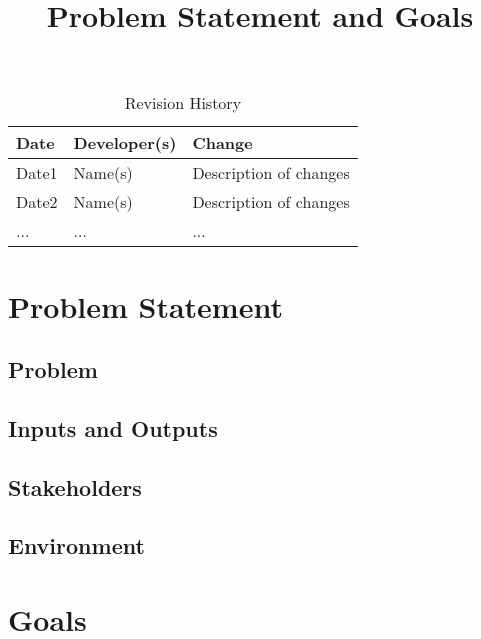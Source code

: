 \documentclass{article}
\title{Problem Statement and Goals\\\progname}
\author{\authname}
\date{}
\begin{document}
    \maketitle

    \begin{table}[hp]
        \caption{Revision History} \label{TblRevisionHistory}
        \begin{tabularx}{\textwidth}{llX}
            \toprule
            \textbf{Date} & \textbf{Developer(s)} & \textbf{Change}\\
            \midrule
            Date1 & Name(s) & Description of changes\\
            Date2 & Name(s) & Description of changes\\
            ... & ... & ...\\
            \bottomrule
        \end{tabularx}
    \end{table}

    \section{Problem Statement}

    \subsection{Problem}


    \subsection{Inputs and Outputs}


    \subsection{Stakeholders}


    \subsection{Environment}

    \section{Goals}
\end{document}
